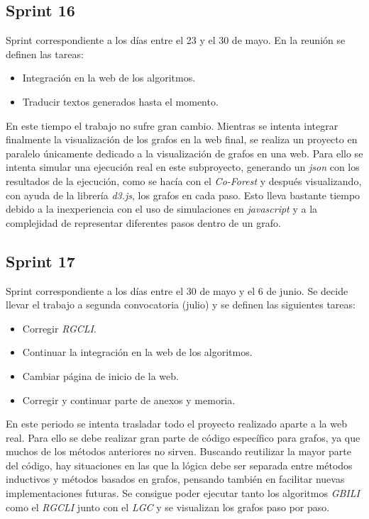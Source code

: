 \subsection{Sprint 16}
Sprint correspondiente a los días entre el 23 y el 30 de mayo. En la reunión se definen las tareas:
\begin{itemize}
	\item Integración en la web de los algoritmos.
	\item Traducir textos generados hasta el momento.
\end{itemize}

En este tiempo el trabajo no sufre gran cambio. Mientras se intenta integrar finalmente la visualización de los grafos en la web final, se realiza un proyecto en paralelo únicamente dedicado a la visualización de grafos en una web. Para ello se intenta simular una ejecución real en este subproyecto, generando un \textit{json} con los resultados de la ejecución, como se hacía con el \textit{Co-Forest} y después visualizando, con ayuda de la librería \textit{d3.js}, los grafos en cada paso. Esto lleva bastante tiempo debido a la inexperiencia con el uso de simulaciones en \textit{javascript} y a la complejidad de representar diferentes pasos dentro de un grafo.

\subsection{Sprint 17}
Sprint correspondiente a los días entre el 30 de mayo y el 6 de junio. Se decide llevar el trabajo a segunda convocatoria (julio) y se definen las siguientes tareas:
\begin{itemize}
	\item Corregir \textit{RGCLI}.
	\item Continuar la integración en la web de los algoritmos.
	\item Cambiar página de inicio de la web.
	\item Corregir y continuar parte de anexos y memoria.
\end{itemize}

En este periodo se intenta trasladar todo el proyecto realizado aparte a la web real. Para ello se debe realizar gran parte de código específico para grafos, ya que muchos de los métodos anteriores no sirven. Buscando reutilizar la mayor parte del código, hay situaciones en las que la lógica debe ser separada entre métodos inductivos y métodos basados en grafos, pensando también en facilitar nuevas implementaciones futuras.
Se consigue poder ejecutar tanto los algoritmos \textit{GBILI} como el \textit{RGCLI} junto con el \textit{LGC} y se visualizan los grafos paso por paso.

